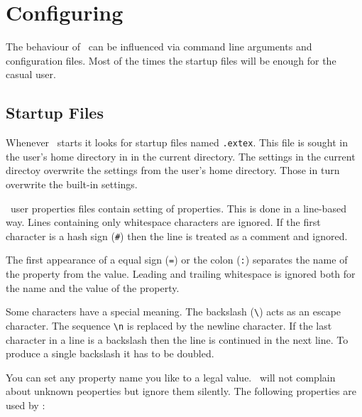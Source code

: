 \documentclass{extex-doc}
\makeatletter
\newcommand\File[1]{\texttt{#1}\index{#1@\textsf{#1}}}
\makeatother
\begin{document}
\section{Configuring \ExTeX}

The behaviour of \ExTeX\ can be influenced via command line arguments
and configuration files. Most of the times the startup files will be
enough for the casual user.


\subsection{Startup Files}

Whenever \ExTeX\ starts it looks for startup files named
\File{.extex}. This file is sought in the user's home directory in
in the current directory. The settings in the current directoy
overwrite the settings from the user's home directory. Those in turn
overwrite the built-in settings.

\ExTeX\ user properties files contain setting of properties. This is
done in a line-based way. Lines containing only whitespace characters
are ignored. If the first character is a hash sign (\verb|#|) then the
line is treated as a comment and ignored.

The first appearance of a equal sign (\verb|=|) or the colon
(\verb|:|) separates the name of the property from the value. Leading
and trailing whitespace is ignored both for the name and the value of
the property.

Some characters have a special meaning. The backslash (\verb|\|) acts
as an escape character. The sequence \verb|\n| is replaced by the
newline character. If the last character in a line is a backslash then
the line is continued in the next line. To produce a single backslash
it has to be doubled.

You can set any property name you like to a legal value. \ExTeX\ will
not complain about unknown peoperties but ignore them silently.
The following properties are used by \ExTeX:
\end{document}
